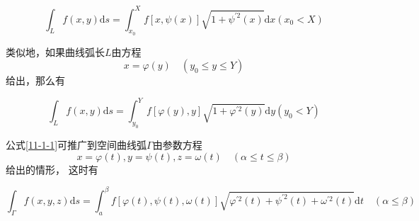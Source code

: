 \documentclass[12pt, a4paper]{article}
\numberwithin{equation}{section}
\begin{document}
    \begin{equation}
        \int_L f(x, y) \mathrm{d} s=\int_{x_0}^X f[x, \psi(x)] \sqrt{1+\psi^{\prime 2}(x)} \mathrm{d} x\left(x_0<X\right)
    \end{equation}

    类似地，如果曲线弧长\(L\)由方程\[x=\varphi(y) \quad (y_0 \leq y \leq Y)\]给出，那么有

    \begin{equation}
        \int_L f(x, y) \mathrm{d} s=\int_{y_0}^Y f[\varphi(y), y] \sqrt{1+\varphi^{\prime 2}(y)} \mathrm{d} y\left(y_0<Y\right)
    \end{equation}

    公式\ref{11-1-1}可推广到空间曲线弧\(\varGamma\)由参数方程\[x=\varphi(t), y=\psi(t), z=\omega(t) \quad(\alpha \leq t \leq \beta)\]给出的情形，
    这时有

    \begin{equation}
        \int_\varGamma f(x, y, z) \mathrm{d} s=\int_a^\beta f[\varphi(t), \psi(t), \omega(t)] \sqrt{\varphi^{\prime 2}(t)+\psi^{\prime 2}(t)+\omega^{\prime 2}(t)} \mathrm{d} t
        \quad (\alpha \leq \beta)
    \end{equation}
\end{document}
